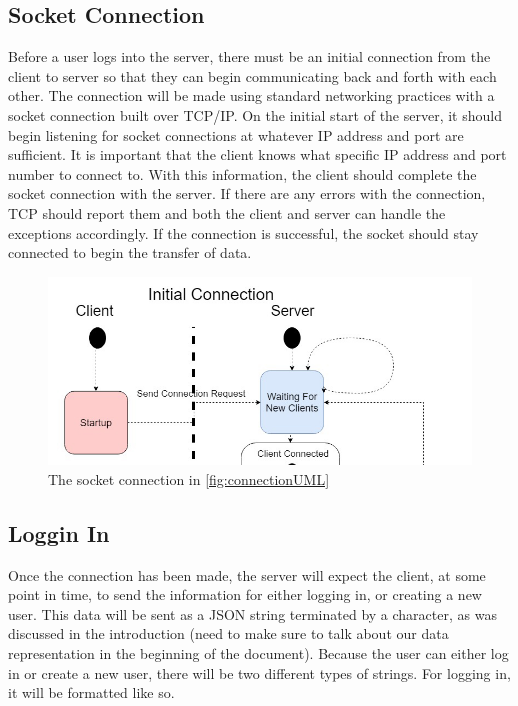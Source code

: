 \documentclass[titlepage]{article}
\begin{document}
    \subsection{Socket Connection}
        Before a user logs into the server, there must be an initial connection from the client 
        to server so that they can begin communicating back and forth with each other. 
        The connection will be made using standard networking practices with a socket connection
        built over TCP/IP. On the initial start of the server, it should begin listening for socket
        connections at whatever IP address and port are sufficient. It is important that the client
        knows what specific IP address and port number to connect to. With this information, the 
        client should complete the socket connection with the server. If there are any errors with
        the connection, TCP should report them and both the client and server can handle the exceptions
        accordingly. If the connection is successful, the socket should stay connected to begin the
        transfer of data. 
        \begin{figure}[h]
            \centering
            \includegraphics[width=1\linewidth]{2-2}
            \caption{The socket connection in \ref{fig:connectionUML}}
            \label{fig:socketUML}
        \end{figure}

    \subsection{Loggin In}
        Once the connection has been made, the server will expect the client, at some point in time,
        to send the information for either logging in, or creating a new user. This data will be sent
        as a JSON string terminated by a  character, as was discussed in the introduction 
        (need to make sure to talk about our data representation in the beginning of the document).
        Because the user can either log in or create a new user, there will be two different types of
        strings. For logging in, it will be formatted like so.
\end{document}
